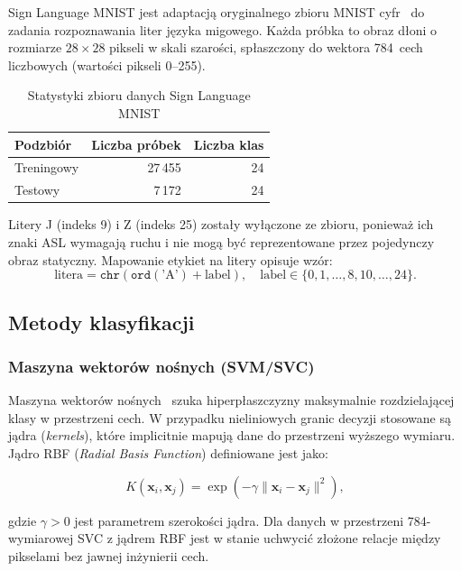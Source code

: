 Sign Language MNIST jest adaptacją oryginalnego zbioru MNIST cyfr~\cite{lecun1998}
do zadania rozpoznawania liter języka migowego. Każda próbka to obraz dłoni
o rozmiarze $28 \times 28$ pikseli w skali szarości, spłaszczony do wektora
784~cech liczbowych (wartości pikseli 0--255).

\begin{table}[H]
    \centering
    \caption{Statystyki zbioru danych Sign Language MNIST}
    \label{tab:dataset}
    \begin{tabular}{lrr}
        \toprule
        \textbf{Podzbiór} & \textbf{Liczba próbek} & \textbf{Liczba klas} \\
        \midrule
        Treningowy & 27\,455 & 24 \\
        Testowy    & 7\,172  & 24 \\
        \bottomrule
    \end{tabular}
\end{table}

Litery J (indeks 9) i Z (indeks 25) zostały wyłączone ze zbioru, ponieważ
ich znaki ASL wymagają ruchu i nie mogą być reprezentowane przez pojedynczy
obraz statyczny. Mapowanie etykiet na litery opisuje wzór:
\[
    \text{litera} = \texttt{chr}\!\left(\texttt{ord}(\text{'A'}) + \text{label}\right),
    \quad \text{label} \in \{0,1,\ldots,8,10,\ldots,24\}.
\]

\subsection{Metody klasyfikacji}

\subsubsection{Maszyna wektorów nośnych (SVM/SVC)}

Maszyna wektorów nośnych~\cite{cortes1995} szuka hiperpłaszczyzny maksymalnie
rozdzielającej klasy w przestrzeni cech. W przypadku nieliniowych granic decyzji
stosowane są jądra (\textit{kernels}), które implicitnie mapują dane do przestrzeni
wyższego wymiaru. Jądro RBF (\textit{Radial Basis Function}) definiowane jest jako:

\begin{equation}
    K(\mathbf{x}_i, \mathbf{x}_j) = \exp\!\left(-\gamma \|\mathbf{x}_i - \mathbf{x}_j\|^2\right),
\end{equation}

gdzie $\gamma > 0$ jest parametrem szerokości jądra. Dla danych w przestrzeni
784-wymiarowej SVC z jądrem RBF jest w stanie uchwycić złożone relacje między
pikselami bez jawnej inżynierii cech.

